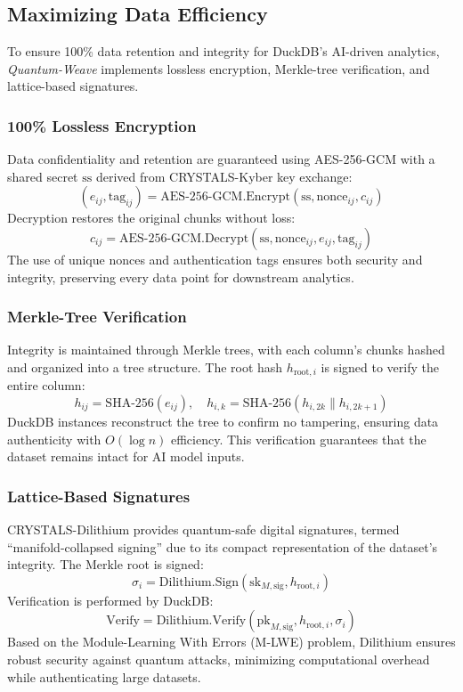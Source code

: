 \documentclass[12pt]{article}
\begin{document}
\subsection{Maximizing Data Efficiency}
To ensure 100\% data retention and integrity for DuckDB’s AI-driven analytics, \textit{Quantum-Weave} implements lossless encryption, Merkle-tree verification, and lattice-based signatures.

\subsubsection{100\% Lossless Encryption}
Data confidentiality and retention are guaranteed using AES-256-GCM with a shared secret \( \text{ss} \) derived from CRYSTALS-Kyber key exchange:
\[
(e_{ij}, \text{tag}_{ij}) = \text{AES-256-GCM.Encrypt}(\text{ss}, \text{nonce}_{ij}, c_{ij})
\]
Decryption restores the original chunks without loss:
\[
c_{ij} = \text{AES-256-GCM.Decrypt}(\text{ss}, \text{nonce}_{ij}, e_{ij}, \text{tag}_{ij})
\]
The use of unique nonces and authentication tags ensures both security and integrity, preserving every data point for downstream analytics.

\subsubsection{Merkle-Tree Verification}
Integrity is maintained through Merkle trees, with each column’s chunks hashed and organized into a tree structure. The root hash \( h_{\text{root},i} \) is signed to verify the entire column:
\[
h_{ij} = \text{SHA-256}(e_{ij}), \quad h_{i,k} = \text{SHA-256}(h_{i,2k} \| h_{i,2k+1})
\]
DuckDB instances reconstruct the tree to confirm no tampering, ensuring data authenticity with \( O(\log n) \) efficiency. This verification guarantees that the dataset remains intact for AI model inputs.

\subsubsection{Lattice-Based Signatures}
CRYSTALS-Dilithium provides quantum-safe digital signatures, termed ``manifold-collapsed signing'' due to its compact representation of the dataset’s integrity. The Merkle root is signed:
\[
\sigma_i = \text{Dilithium.Sign}(\text{sk}_{M,\text{sig}}, h_{\text{root},i})
\]
Verification is performed by DuckDB:
\[
\text{Verify} = \text{Dilithium.Verify}(\text{pk}_{M,\text{sig}}, h_{\text{root},i}, \sigma_i)
\]
Based on the Module-Learning With Errors (M-LWE) problem, Dilithium ensures robust security against quantum attacks, minimizing computational overhead while authenticating large datasets.
\end{document}
